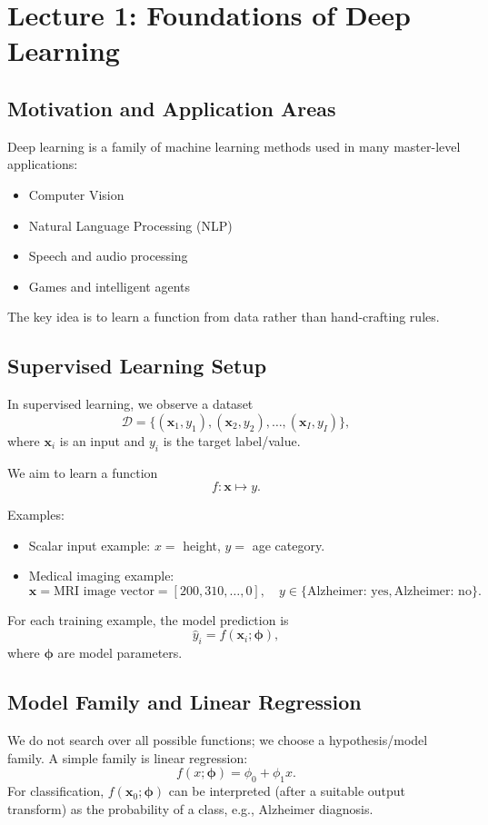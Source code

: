 \section{Lecture 1: Foundations of Deep Learning}

\subsection{Motivation and Application Areas}
Deep learning is a family of machine learning methods used in many master-level
applications:
\begin{itemize}
    \item Computer Vision
    \item Natural Language Processing (NLP)
    \item Speech and audio processing
    \item Games and intelligent agents
\end{itemize}

The key idea is to learn a function from data rather than hand-crafting rules.

\subsection{Supervised Learning Setup}
In supervised learning, we observe a dataset
\[
\mathcal{D} = \{(\mathbf{x}_1, y_1), (\mathbf{x}_2, y_2), \dots, (\mathbf{x}_I, y_I)\},
\]
where $\mathbf{x}_i$ is an input and $y_i$ is the target label/value.

We aim to learn a function
\[
f:\mathbf{x}\mapsto y.
\]

Examples:
\begin{itemize}
    \item Scalar input example: $x=$ height, $y=$ age category.
    \item Medical imaging example:
    \[
    \mathbf{x} = \text{MRI image vector} = [200,310,\dots,0], \quad
    y \in \{\text{Alzheimer: yes},\text{Alzheimer: no}\}.
    \]
\end{itemize}

For each training example, the model prediction is
\[
\hat{y}_i = f(\mathbf{x}_i;\boldsymbol{\phi}),
\]
where $\boldsymbol{\phi}$ are model parameters.

\subsection{Model Family and Linear Regression}
We do not search over all possible functions; we choose a hypothesis/model family.
A simple family is linear regression:
\[
f(x;\boldsymbol{\phi}) = \phi_0 + \phi_1 x.
\]
For classification, $f(\mathbf{x}_0;\boldsymbol{\phi})$ can be interpreted (after a
suitable output transform) as the probability of a class, e.g., Alzheimer diagnosis.

